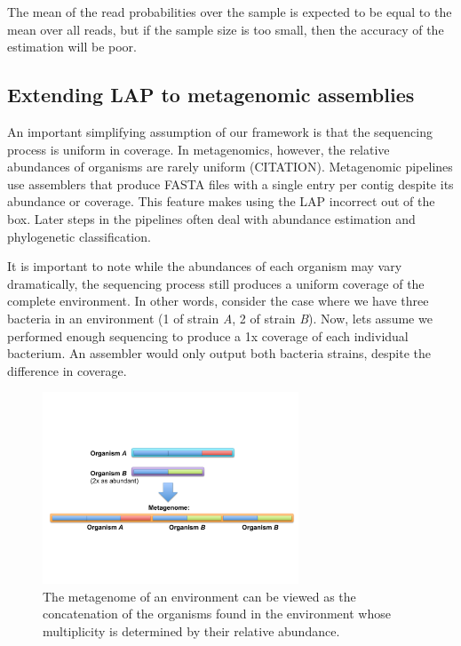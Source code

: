 \documentclass[conference]{IEEEtran}
\begin{document}
The mean of the read probabilities over the sample is expected to be equal to the mean over all reads, but if the sample size is too small, then the accuracy of the estimation will be poor.

\subsection{Extending LAP to metagenomic assemblies}
An important simplifying assumption of our framework is that the sequencing process is uniform in coverage.
In metagenomics, however, the relative abundances of organisms are rarely uniform (CITATION).
Metagenomic pipelines use assemblers that produce FASTA files with a single entry per contig despite its abundance or coverage.
This feature makes using the LAP incorrect out of the box.
Later steps in the pipelines often deal with abundance estimation and phylogenetic classification.

It is important to note while the abundances of each organism may vary dramatically, the sequencing process still produces a uniform coverage of the complete environment.
In other words, consider the case where we have three bacteria in an environment (1 of strain \emph{A}, 2 of strain \emph{B}).
Now, lets assume we performed enough sequencing to produce a 1x coverage of each individual bacterium.
An assembler would only output both bacteria strains, despite the difference in coverage.


\begin{figure}[!t]
\centering
\includegraphics[width=3in]{metagenome}
\caption{The metagenome of an environment can be viewed as the concatenation of the organisms found in the environment whose multiplicity is determined by their relative abundance.}
\label{fig:metagenome}
\end{figure}
\end{document}
